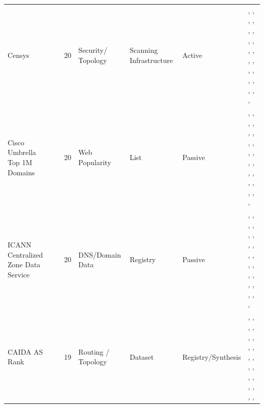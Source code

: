 \documentclass[11pt,a4paper]{article}
\begin{document}
\begin{longtable}{@{}p{}p{}p{}p{}p{}p{}p{}@{}}
Censys & \cite{censys} & 20 & Security/ Topology & Scanning Infrastructure & Active & \cite{10.1145/3730567.3764781}, \cite{10.1145/3646547.3688449}, \cite{10.1145/3618257.3624845}, \cite{10.1145/3618257.3624831}, \cite{10.1145/3618257.3624840}, \cite{10.1145/3517745.3561431}, \cite{10.1145/3517745.3561425}, \cite{10.1145/3517745.3561423}, \cite{10.1145/3487552.3487820}, \cite{10.1007/978-3-030-72582-2_4}, \cite{10.1007/978-3-030-72582-2_11}, \cite{10.1007/978-3-030-72582-2_25}, \cite{10.1007/978-3-030-98785-5_30}, \cite{10.1007/978-3-031-56249-5_5}, \cite{10.1007/978-3-031-56249-5_8}, \cite{10.1007/978-3-031-85960-1_3}, \cite{10.1145/3777912.3839831}, \cite{10.1145/3777912.3809148}, \cite{10.1007/978-3-032-18268-5_9}, \cite{10.1145/3777912.3839828} \\
Cisco Umbrella Top 1M Domains & \cite{ciscoumbrellatop1m} & 20 & Web Popularity & List & Passive & \cite{10.1145/3730567.3764501}, \cite{10.1145/3646547.3688449}, \cite{10.1145/3646547.3688444}, \cite{10.1145/3618257.3624821}, \cite{10.1145/3618257.3624844}, \cite{10.1145/3517745.3561440}, \cite{10.1145/3517745.3561444}, \cite{10.1145/3487552.3487826}, \cite{10.1007/978-3-030-72582-2_17}, \cite{10.1007/978-3-030-72582-2_25}, \cite{10.1007/978-3-030-72582-2_31}, \cite{10.1007/978-3-030-98785-5_15}, \cite{10.1007/978-3-031-28486-1_21}, \cite{10.1007/978-3-031-56249-5_2}, \cite{10.1007/978-3-031-56249-5_12}, \cite{10.1007/978-3-031-85960-1_3}, \cite{10.1007/978-3-031-85960-1_5}, \cite{10.1007/978-3-032-18268-5_1}, \cite{10.1145/3777912.3839801}, \cite{10.1145/3777912.3839807} \\
ICANN Centralized Zone Data Service & \cite{czds} & 20 & DNS/Domain Data & Registry & Passive & \cite{10.1145/3730567.3764501}, \cite{10.1145/3646547.3689021}, \cite{10.1145/3646547.3689017}, \cite{10.1145/3618257.3624844}, \cite{10.1145/3618257.3624821}, \cite{10.1145/3618257.3624835}, \cite{10.1145/3618257.3624802}, \cite{10.1145/3618257.3624797}, \cite{10.1145/3517745.3561440}, \cite{10.1145/3487552.3487826}, \cite{10.1145/3487552.3487816}, \cite{10.1007/978-3-030-98785-5_2}, \cite{10.1007/978-3-030-98785-5_23}, \cite{10.1007/978-3-031-28486-1_22}, \cite{10.1007/978-3-031-56249-5_9}, \cite{10.1007/978-3-031-56249-5_10}, \cite{10.1007/978-3-031-56252-5_13}, \cite{10.1007/978-3-031-85960-1_5}, \cite{10.1145/3777912.3809157}, \cite{10.1145/3777912.3839803} \\
CAIDA AS Rank & \cite{caidaasrank} & 19 & Routing / Topology & Dataset & Registry/Synthesis & \cite{10.1145/3730567.3764436}, \cite{10.1145/3646547.3688429}, \cite{10.1145/3618257.3624819}, \cite{10.1145/3517745.3561443}, \cite{10.1145/3517745.3561419}, \cite{10.1145/3487552.3487825}, \cite{10.1007/978-3-030-98785-5_10}, \cite{10.1007/978-3-030-98785-5_14}, \cite{10.1007/978-3-030-98785-5_20}, \cite{10.1007/978-3-030-98785-5_28}, \cite{10.1007/978-3-030-98785-5_29}, \cite{10.1007/978-3-031-28486-1_17}, \cite{10.1007/978-3-031-85960-1_14}, \cite{10.1145/3777912.3839834}, \cite{10.1007/978-3-032-18268-5_2}, \cite{10.1007/978-3-032-18268-5_3}, \cite{10.1145/3777912.3839800}, \cite{10.1145/3777912.3839785}, \cite{10.1145/3777912.3809144} \\

\end{longtable}
\end{document}
